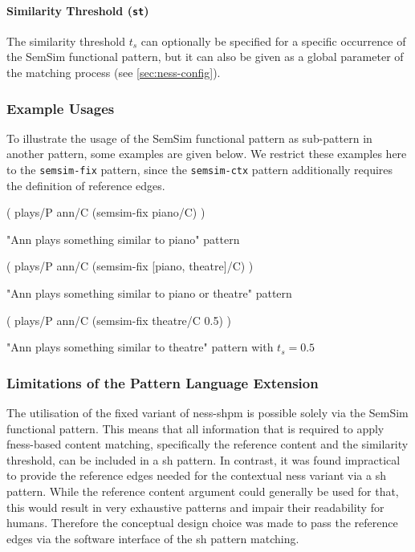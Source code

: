 \documentclass[11pt]{scrreprt}
\begin{document}
\paragraph{Similarity Threshold (\texttt{\gls{st}})}
The similarity threshold \(t_s\) can optionally be specified for a specific occurrence of the SemSim functional pattern, but it can also be given as a global parameter of the matching process (see \cref{sec:ness-config}). 

\subsubsection{Example Usages}
\label{sec:semsim-pattern-example-usages}

To illustrate the usage of the SemSim functional pattern as sub-pattern in another pattern, some examples are given below. We restrict these examples here to the \texttt{semsim-fix} pattern, since the \texttt{semsim-ctx} pattern additionally requires the definition of reference edges.

\begin{pattern}[h!]
  \normalfont\sffamily
  \centering
  ( plays/P ann/C (semsim-fix piano/C) )
  \caption{"Ann plays something similar to piano" pattern}
\end{pattern}

\begin{pattern}[h!]
  \normalfont\sffamily
  \centering
  ( plays/P ann/C (semsim-fix [piano, theatre]/C) )
  \caption{"Ann plays something similar to piano or theatre" pattern}
\end{pattern}


\begin{pattern}[h!]
  \normalfont\sffamily
  \centering
  ( plays/P ann/C (semsim-fix theatre/C 0.5) )
  \caption{"Ann plays something similar to theatre" pattern with \(t_s = 0.5\)}
\end{pattern}


\subsubsection{Limitations of the Pattern Language Extension}
\label{sec:pl-extension-limitations}
The utilisation of the fixed variant of \gls{ness-shpm} is possible solely via the SemSim functional pattern. This means that all information that is required to apply \gls{fness}-based content matching, specifically the reference content and the similarity threshold, can be included in a \gls{sh} pattern. In contrast, it was found impractical to provide the reference edges needed for the contextual \gls{ness} variant via a \gls{sh} pattern. While the reference content argument could generally be used for that, this would result in very exhaustive patterns and impair their readability for humans. Therefore the conceptual design choice was made to pass the reference edges via the software interface of the \gls{sh} pattern matching.
\end{document}
